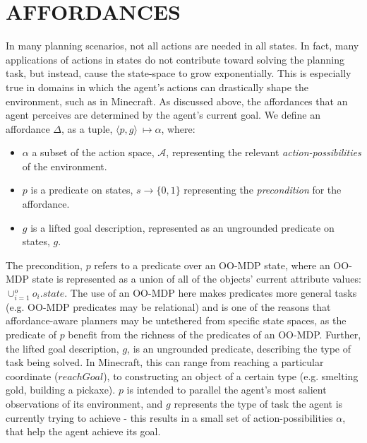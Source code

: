 \documentclass[]{article}
\begin{document}



\section{AFFORDANCES}
\label{sec:affordances}

In many planning scenarios, not all actions are needed in all
states. In fact, many applications of actions in states do not
contribute toward solving the planning task, but instead, cause the
state-space to grow exponentially. This is especially true in domains in which
the agent's actions can drastically shape the environment, such as in
Minecraft. As discussed above, the affordances that an 
agent perceives are determined by the agent's current goal. We define an affordance $\Delta$, 
as a tuple, $\langle p,g\rangle\ \longmapsto \alpha$,
where:
\begin{itemize}
\item[] $\alpha$ a subset of the action space, $\mathcal{A}$, representing the relevant {\it action-possibilities} of the environment.
\item[] $p$ is a predicate on states, $s \longrightarrow \{$0$, 1\}$
  representing the {\em precondition} for the affordance.
\item[] $g$ is a lifted goal description, represented as an ungrounded predicate on states, $g$.
\end{itemize}

The precondition, $p$ refers to a predicate over an OO-MDP state,
where an OO-MDP state is represented as a union of all of the objects'
current attribute values: $\cup_{i = 1}^o o_i.state$.  The use of an
OO-MDP here makes predicates more general tasks (e.g. OO-MDP
predicates may be relational) and is one of the reasons that
affordance-aware planners may be untethered from specific state
spaces, as the predicate of $p$ benefit from the richness of the
predicates of an OO-MDP. Further, the lifted goal description, $g$, is
an ungrounded predicate, describing the type of task being solved. In
Minecraft, this can range from reaching a particular coordinate
($reachGoal$), to constructing an object of a certain type
(e.g. smelting gold, building a pickaxe). $p$ is intended to parallel
the agent's most salient observations of its environment, and $g$
represents the type of task the agent is currently trying to achieve -
this results in a small set of action-possibilities $\alpha$, that
help the agent achieve its goal.
\end{document}
